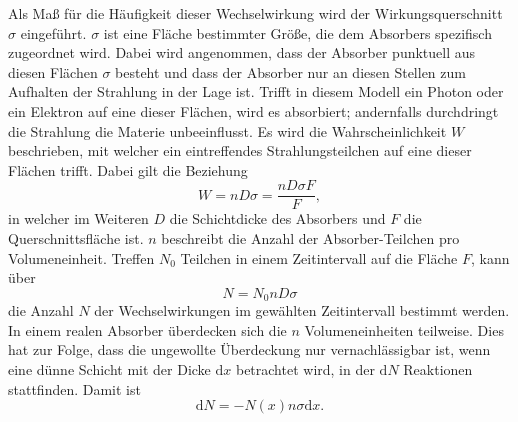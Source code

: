 Als Maß für die Häufigkeit dieser Wechselwirkung wird der Wirkungsquerschnitt $\sigma$ eingeführt.
$\sigma$ ist eine Fläche bestimmter Größe, die dem Absorbers spezifisch zugeordnet wird. 
Dabei wird angenommen, dass der Absorber punktuell aus diesen Flächen $\sigma$ besteht und dass der Absorber nur an diesen Stellen zum Aufhalten der Strahlung in der Lage ist.
Trifft in diesem Modell ein Photon oder ein Elektron auf eine dieser Flächen, wird es absorbiert; andernfalls durchdringt die Strahlung die Materie unbeeinflusst.
Es wird die Wahrscheinlichkeit $W$ beschrieben, mit welcher ein eintreffendes Strahlungsteilchen auf eine dieser Flächen trifft. 
Dabei gilt die Beziehung 
\begin{equation}
	W=n D \sigma =\frac{n D \sigma F}{F},
\end{equation}
in welcher im Weiteren $D$ die Schichtdicke des Absorbers und $F$ die Querschnittsfläche ist. 
$n$ beschreibt die Anzahl der Absorber-Teilchen pro Volumeneinheit.
Treffen $N_0$ Teilchen in einem Zeitintervall auf die Fläche $F$, kann über
\begin{equation}
	N=N_0 n D \sigma
\end{equation}
die Anzahl $N$ der Wechselwirkungen im gewählten Zeitintervall bestimmt werden. 
In einem realen Absorber überdecken sich die $n$ Volumeneinheiten teilweise. 
Dies hat zur Folge, dass die ungewollte Überdeckung nur vernachlässigbar ist, wenn eine dünne Schicht mit der Dicke $\mathup{d}x$ betrachtet wird, in der $\mathup{d}N$ Reaktionen stattfinden. 
Damit ist
\begin{equation}
	\mathup{d}N=-N(x)  n \sigma \mathup{d}x.
	\label{eq:Absorptionsgesetz_Vorstufe}
\end{equation}


